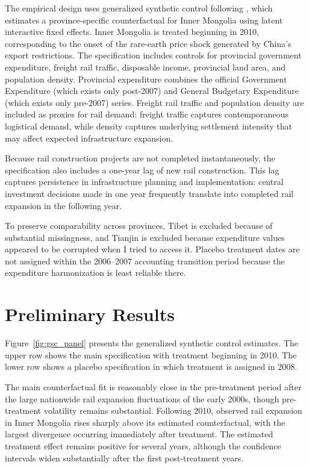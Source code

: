 \documentclass[12pt]{article}
\begin{document}
The empirical design uses generalized synthetic control following \textcite{xuGeneralizedSyntheticControl2017b}, which estimates a province-specific counterfactual for Inner Mongolia using latent interactive fixed effects. Inner Mongolia is treated beginning in 2010, corresponding to the onset of the rare-earth price shock generated by China's export restrictions. The specification includes controls for provincial government expenditure, freight rail traffic, disposable income, provincial land area, and population density. Provincial expenditure combines the official Government Expenditure (which exists only post-2007) and General Budgetary Expenditure (which exists only pre-2007) series. Freight rail traffic and population density are included as proxies for rail demand: freight traffic captures contemporaneous logistical demand, while density captures underlying settlement intensity that may affect expected infrastructure expansion.

Because rail construction projects are not completed instantaneously, the specification also includes a one-year lag of new rail construction. This lag captures persistence in infrastructure planning and implementation: central investment decisions made in one year frequently translate into completed rail expansion in the following year.

To preserve comparability across provinces, Tibet is excluded because of substantial missingness, and Tianjin is excluded because expenditure values appeared to be corrupted when I tried to access it. Placebo treatment dates are not assigned within the 2006--2007 accounting transition period because the expenditure harmonization is least reliable there.

\section{Preliminary Results}

Figure~\ref{fig:gsc_panel} presents the generalized synthetic control estimates. The upper row shows the main specification with treatment beginning in 2010. The lower row shows a placebo specification in which treatment is assigned in 2008.

The main counterfactual fit is reasonably close in the pre-treatment period after the large nationwide rail expansion fluctuations of the early 2000s, though pre-treatment volatility remains substantial. Following 2010, observed rail expansion in Inner Mongolia rises sharply above its estimated counterfactual, with the largest divergence occurring immediately after treatment. The estimated treatment effect remains positive for several years, although the confidence intervals widen substantially after the first post-treatment years.
\end{document}

